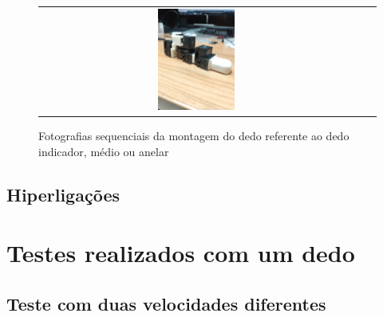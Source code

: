 \begin{figure}[H]
\begin{tabular}{ccc}
  \includegraphics[width=0.25\textwidth]{figs/appendix/dedo/11.jpg} &
\end{tabular}
\caption{Fotografias sequenciais da montagem do dedo referente ao dedo indicador, médio ou anelar}
\end{figure}

\label{appendix:montagem_dedo}

\subsection{Hiperligações}

\label{appendix:videos}

\section{Testes realizados com um dedo}

\subsection{Teste com duas velocidades diferentes}

